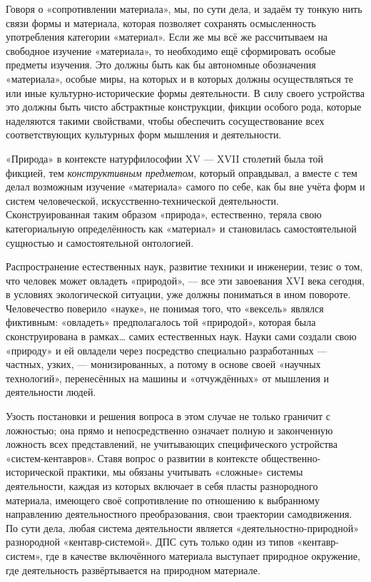 \documentclass[11pt,a4paper]{article}
\begin{document}
Говоря о «сопротивлении материала», мы, по сути дела, и задаём ту тонкую нить
связи формы и материала, которая позволяет сохранять осмысленность
употребления категории «материал». Если же мы всё же рассчитываем на свободное
изучение «материала», то необходимо ещё сформировать особые предметы изучения.
Это должны быть как бы автономные обозначения «материала», особые миры, на
которых и в которых должны осуществляться те или иные культурно-исторические
формы деятельности. В силу своего устройства это должны быть чисто абстрактные
конструкции, фикции особого рода, которые наделяются такими свойствами, чтобы
обеспечить сосуществование всех соответствующих культурных форм мышления и
деятельности.

«Природа» в контексте натурфилософии XV — XVII столетий была той фикцией, тем
\emph{конструктивным предметом}, который оправдывал, а вместе с тем делал
возможным изучение «материала» самого по себе, как бы вне учёта форм и систем
человеческой, искусственно-технической деятельности. Сконструированная таким
образом «природа», естественно, теряла свою категориальную определённость как
«материал» и становилась самостоятельной сущностью и самостоятельной
онтологией.

Распространение естественных наук, развитие техники и инженерии, тезис о том,
что человек может овладеть «природой», — все эти завоевания XVI века сегодня,
в условиях экологической ситуации, уже должны пониматься в ином повороте.
Человечество поверило «науке», не понимая того, что «вексель» являлся
фиктивным: «овладеть» предполагалось той «природой», которая была
сконструирована в рамках… самих естественных наук. Науки сами создали свою
«природу» и ей овладели через посредство специально разработанных — частных,
узких, — монизированных, а потому в основе своей «научных технологий»,
перенесённых на машины и «отчуждённых» от мышления и деятельности людей.

Узость постановки и решения вопроса в этом случае не только граничит с
ложностью; она прямо и непосредственно означает полную и законченную ложность
всех представлений, не учитывающих специфического устройства
«систем-кентавров».  Ставя вопрос о развитии в контексте
общественно-исторической практики, мы обязаны учитывать «сложные» системы
деятельности, каждая из которых включает в себя пласты разнородного материала,
имеющего своё сопротивление по отношению к выбранному направлению
деятельностного преобразования, свои траектории самодвижения. По сути дела,
любая система деятельности является «деятельностно-природной» разнородной
«кентавр-системой». ДПС суть только один из типов «кентавр-систем», где в
качестве включённого материала выступает природное окружение, где деятельность
развёртывается на природном материале.
\end{document}
